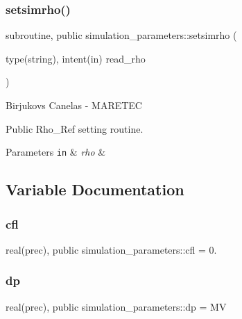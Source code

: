 \subsubsection{\texorpdfstring{setsimrho()}{setsimrho()}}
{\footnotesize\ttfamily subroutine, public simulation\+\_\+parameters\+::setsimrho (\begin{DoxyParamCaption}\item[{type(string), intent(in)}]{read\+\_\+rho }\end{DoxyParamCaption})}



Birjukovs Canelas -\/ M\+A\+R\+E\+T\+EC 

Public Rho\+\_\+\+Ref setting routine. 
\begin{DoxyParams}[1]{Parameters}
\mbox{\tt in}  & {\em rho} & \\
\hline
\end{DoxyParams}


\subsection{Variable Documentation}
\mbox{\label{namespacesimulation__parameters_a82ce5585265987eedbbaad0cd9cac673}} 
\subsubsection{\texorpdfstring{cfl}{cfl}}
{\footnotesize\ttfamily real(prec), public simulation\+\_\+parameters\+::cfl = 0.}

\mbox{\label{namespacesimulation__parameters_afe85a1735413a2cc7a220910f68bd214}} 
\subsubsection{\texorpdfstring{dp}{dp}}
{\footnotesize\ttfamily real(prec), public simulation\+\_\+parameters\+::dp = MV}

\mbox{\label{namespacesimulation__parameters_a5f4b25aae7394e93796760f8720af525}} 

